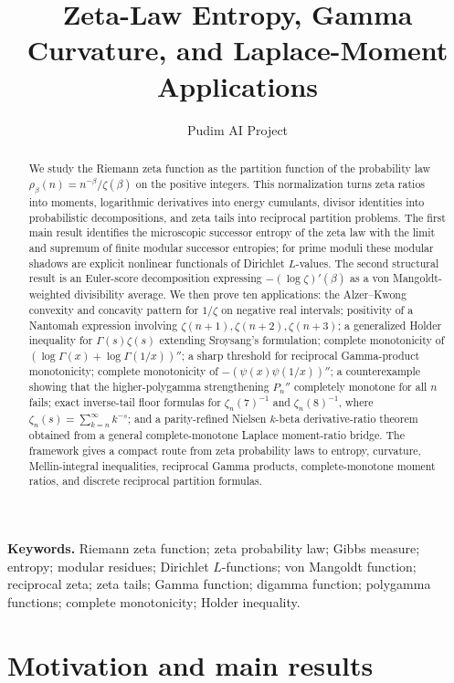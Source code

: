 \documentclass[11pt]{article}
\title{Zeta-Law Entropy, Gamma Curvature, and Laplace-Moment Applications}
\author{Pudim AI Project}
\date{}
\numberwithin{equation}{section}
\theoremstyle{definition}
\theoremstyle{remark}
\newcommand{\1}{\mathbf 1}
\begin{document}
\maketitle

\begin{abstract}
We study the Riemann zeta function as the partition function of the probability law \(\rho_\beta(n)=n^{-\beta}/\zeta(\beta)\) on the positive integers.  This normalization turns zeta ratios into moments, logarithmic derivatives into energy cumulants, divisor identities into probabilistic decompositions, and zeta tails into reciprocal partition problems.  The first main result identifies the microscopic successor entropy of the zeta law with the limit and supremum of finite modular successor entropies; for prime moduli these modular shadows are explicit nonlinear functionals of Dirichlet \(L\)-values.  The second structural result is an Euler-score decomposition expressing \(-(\log\zeta)'(\beta)\) as a von Mangoldt-weighted divisibility average.  We then prove ten applications: the Alzer--Kwong convexity and concavity pattern for \(1/\zeta\) on negative real intervals; positivity of a Nantomah expression involving \(\zeta(n+1),\zeta(n+2),\zeta(n+3)\); a generalized Holder inequality for \(\Gamma(s)\zeta(s)\) extending Sroysang's formulation; complete monotonicity of \((\log\Gamma(x)+\log\Gamma(1/x))''\); a sharp threshold for reciprocal Gamma-product monotonicity; complete monotonicity of \(-(\psi(x)\psi(1/x))''\); a counterexample showing that the higher-polygamma strengthening \(P_n''\) completely monotone for all \(n\) fails; exact inverse-tail floor formulas for \(\zeta_n(7)^{-1}\) and \(\zeta_n(8)^{-1}\), where \(\zeta_n(s)=\sum_{k=n}^{\infty}k^{-s}\); and a parity-refined Nielsen \(k\)-beta derivative-ratio theorem obtained from a general complete-monotone Laplace moment-ratio bridge.  The framework gives a compact route from zeta probability laws to entropy, curvature, Mellin-integral inequalities, reciprocal Gamma products, complete-monotone moment ratios, and discrete reciprocal partition formulas.
\end{abstract}

\noindent\textbf{Keywords.} Riemann zeta function; zeta probability law; Gibbs measure; entropy; modular residues; Dirichlet \(L\)-functions; von Mangoldt function; reciprocal zeta; zeta tails; Gamma function; digamma function; polygamma functions; complete monotonicity; Holder inequality.

\section{Motivation and main results}
\end{document}

